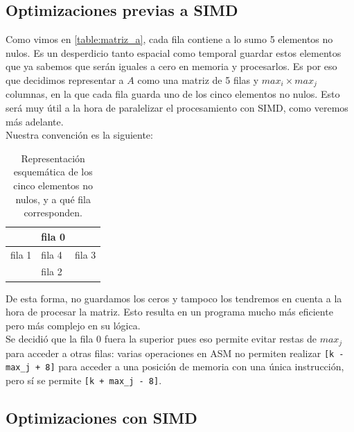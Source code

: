 \documentclass[a4paper]{article}
\begin{document}
\subsection{Optimizaciones previas a SIMD}

Como vimos en \ref{table:matriz_a}, cada fila contiene a lo sumo 5 elementos no 
nulos. Es un desperdicio tanto espacial como temporal guardar estos elementos que ya sabemos
que serán iguales a cero en memoria y procesarlos.
Es por eso que decidimos representar a $A$ como una matriz de 5 filas y $max_i \times max_j$ columnas, 
en la que cada fila guarda uno de los cinco elementos no nulos. Esto será muy útil a la hora de paralelizar
el procesamiento con SIMD, como veremos más adelante. \\
Nuestra convención es la siguiente: 

\begin{table}[!htbp]
\centering
\label{cincovecinos}
\begin{tabular}{l|l|l}
\cline{2-2}
                       & fila 0 &                       \\ \hline
\multicolumn{1}{|l|}{fila 1} & fila 4 & \multicolumn{1}{l|}{fila 3} \\ \hline
                       & fila 2 &                       \\ \cline{2-2}
\end{tabular}
\caption{Representación esquemática de los cinco elementos no nulos, y a qué fila corresponden.}
\end{table}

De esta forma, no guardamos los ceros y tampoco los tendremos en cuenta a la hora de procesar la 
matriz. Esto resulta en un programa mucho más eficiente pero más complejo en su lógica.\\

Se decidió que la fila 0 fuera la superior pues eso permite evitar 
restas de $max_j$ para acceder a otras filas: varias operaciones en ASM no permiten
realizar \texttt{[k - max\_j + 8]} para acceder a una posición de memoria con una única instrucción,
pero sí se permite \texttt{[k + max\_j - 8]}. \\

\subsection{Optimizaciones con SIMD} 
\end{document}

